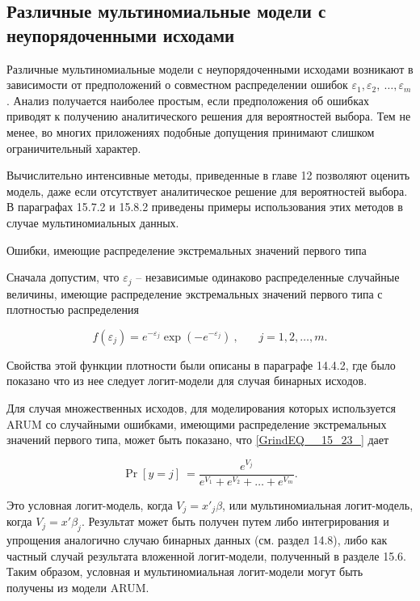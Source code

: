 \subsection{Различные  мультиномиальные модели с неупорядоченными исходами}

Различные мультиномиальные модели с неупорядоченными исходами возникают в зависимости от предположений о совместном распределении ошибок ${\varepsilon }_1,{\varepsilon }_2,\ \dots ,{\varepsilon }_m$. Анализ получается наиболее простым, если предположения об ошибках приводят к получению аналитического решения для вероятностей выбора. Тем не менее, во многих приложениях подобные допущения принимают слишком ограничительный характер.

Вычислительно интенсивные методы, приведенные в главе 12 позволяют оценить модель, даже если отсутствует аналитическое решение для вероятностей выбора. В параграфах 15.7.2 и 15.8.2 приведены примеры использования этих методов в случае мультиномиальных данных.

Ошибки, имеющие распределение экстремальных значений первого типа

Сначала допустим, что ${\varepsilon }_j$ -- независимые одинаково распределенные случайные величины, имеющие распределение экстремальных значений первого типа с плотностью распределения

\begin{equation} \label{GrindEQ__15_25_} f\left({\varepsilon }_j\right)=e^{-{\varepsilon }_j}{\exp  \left(-e^{-{\varepsilon }_j}\right)\ },\ \ \ \ \ \ \ \ j=1,2,\dots ,m. \end{equation} 

Свойства этой функции плотности были описаны в параграфе 14.4.2, где было показано что из нее следует логит-модели для случая бинарных исходов.

Для случая множественных исходов, для моделирования которых используется ARUM со случайными ошибками, имеющими распределение экстремальных значений первого типа, может быть показано, что \eqref{GrindEQ__15_23_} дает

\begin{equation} \label{GrindEQ__15_26_} {\Pr  \left[y=j\right]\ }=\frac{e^{V_j}}{e^{V_1}+e^{V_2}+\dots +e^{V_m}}. \end{equation} 

Это условная логит-модель, когда $V_j=x'_j\beta $, или мультиномиальная логит-модель, когда $V_j=x'{\beta }_j.$ Результат может быть получен путем либо интегрирования и упрощения аналогично случаю бинарных данных (см. раздел 14.8), либо как частный случай результата вложенной логит-модели, полученный в разделе 15.6. Таким образом, условная и мультиномиальная логит-модели могут быть получены из модели ARUM.

